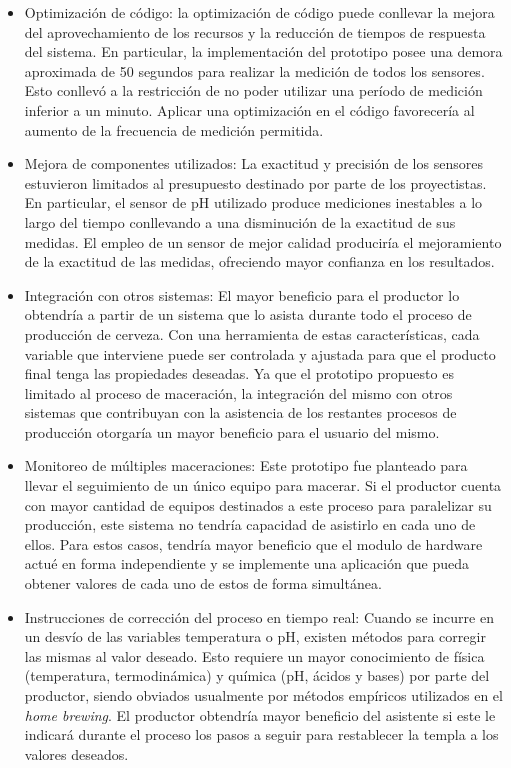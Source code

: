\begin{itemize}
    \item Optimización de código: la optimización de código puede conllevar la mejora del aprovechamiento de los recursos y la reducción de tiempos de respuesta del sistema. En particular, la implementación del prototipo posee una demora aproximada de 50 segundos para realizar la medición de todos los sensores. Esto conllevó a la restricción de no poder utilizar una período de medición inferior a un minuto. Aplicar una optimización en el código favorecería al aumento de la frecuencia de medición permitida.
    
    \item Mejora de componentes utilizados: La exactitud y precisión de los sensores estuvieron limitados al presupuesto destinado por parte de los proyectistas. En particular, el sensor de pH utilizado produce mediciones inestables a lo largo del tiempo conllevando a una disminución de la exactitud de sus medidas. El empleo de un sensor de mejor calidad produciría el mejoramiento de la exactitud de las medidas, ofreciendo mayor confianza en los resultados.
    
    \item Integración con otros sistemas: El mayor beneficio para el productor lo obtendría a partir de un sistema que lo asista durante todo el proceso de producción de cerveza. Con una herramienta de estas características, cada variable que interviene puede ser controlada y ajustada para que el producto final tenga las propiedades deseadas. Ya que el prototipo propuesto es limitado al proceso de maceración, la integración del mismo con otros sistemas que contribuyan con la asistencia de los restantes procesos de producción otorgaría un mayor beneficio para el usuario del mismo.
    
    \item Monitoreo de múltiples maceraciones: Este prototipo fue planteado para llevar el seguimiento de un único equipo para macerar. Si el productor cuenta con mayor cantidad de equipos destinados a este proceso para paralelizar su producción, este sistema no tendría capacidad de asistirlo en cada uno de ellos. Para estos casos, tendría mayor beneficio que el modulo de hardware actué en forma independiente y se implemente una aplicación que pueda obtener valores de cada uno de estos de forma simultánea.
    
    \item Instrucciones de corrección del proceso en tiempo real: Cuando se incurre en un desvío de las variables temperatura o pH, existen métodos para corregir las mismas al valor deseado. Esto requiere un mayor conocimiento de física (temperatura, termodinámica) y química (pH, ácidos y bases) por parte del productor, siendo obviados usualmente por métodos empíricos utilizados en el \textit{home brewing}. El productor obtendría mayor beneficio del asistente si este le indicará durante el proceso los pasos a seguir para restablecer la templa a los valores deseados.
    

\end{itemize}
